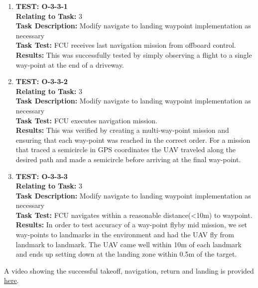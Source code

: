 \begin{enumerate}
\item \textbf{TEST: O-3-3-1}\\
\textbf{Relating to Task:} 3\\
\textbf{Task Description:} Modify navigate to landing waypoint implementation as necessary\\
\textbf{Task Test:} FCU receives last navigation mission from offboard control.\\
\textbf{Results:} This was successfully tested by simply observing a flight to a single way-point at the end of a driveway.

\item \textbf{TEST: O-3-3-2}\\
\textbf{Relating to Task:} 3\\
\textbf{Task Description:} Modify navigate to landing waypoint implementation as necessary\\
\textbf{Task Test:} FCU executes navigation mission.\\
\textbf{Results:} This was verified by creating a multi-way-point mission and ensuring that each way-point was reached in the correct order. For a mission that traced a semicircle in GPS coordinates the UAV traveled along the desired path and made a semicircle before arriving at the final way-point.

\item \textbf{TEST: O-3-3-3}\\
\textbf{Relating to Task:} 3\\
\textbf{Task Description:} Modify navigate to landing waypoint implementation as necessary\\
\textbf{Task Test:} FCU navigates within a reasonable distance(\textless 10m) to waypoint.\\
\textbf{Results:} In order to test accuracy of a way-point flyby mid mission, we set way-points to landmarks in the environment and had the UAV fly from landmark to landmark. The UAV came well within 10m of each landmark and ends up setting down at the landing zone within 0.5m of the target.
\end{enumerate}

A video showing the successful takeoff, navigation, return and landing is provided \href{https://www.youtube.com/watch?v=wye3LynE1CM}{here}.

\newpage

